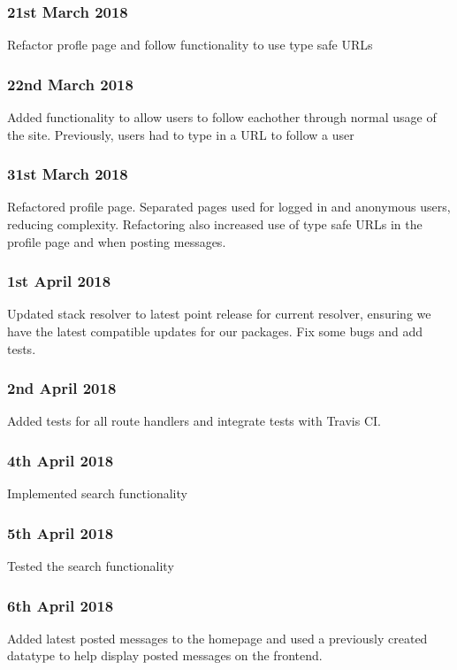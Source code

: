 \subsubsection{21st March 2018}
Refactor profle page and follow functionality to use type safe URLs

\subsubsection{22nd March 2018}
Added functionality to allow users to follow eachother through normal usage of the site.
Previously, users had to type in a URL to follow a user

\subsubsection{31st March 2018}
Refactored profile page. Separated pages used for logged in and anonymous users, reducing
complexity. Refactoring also increased use of type safe URLs in the profile page and
when posting messages.

\subsubsection{1st April 2018}
Updated stack resolver to latest point release for current resolver, ensuring we have
the latest compatible updates for our packages. Fix some bugs and add tests.

\subsubsection{2nd April 2018}
Added tests for all route handlers and integrate tests with Travis CI.

\subsubsection{4th April 2018}
Implemented search functionality

\subsubsection{5th April 2018}
Tested the search functionality

\subsubsection{6th April 2018}
Added latest posted messages to the homepage and used a previously created datatype
to help display posted messages on the frontend.

